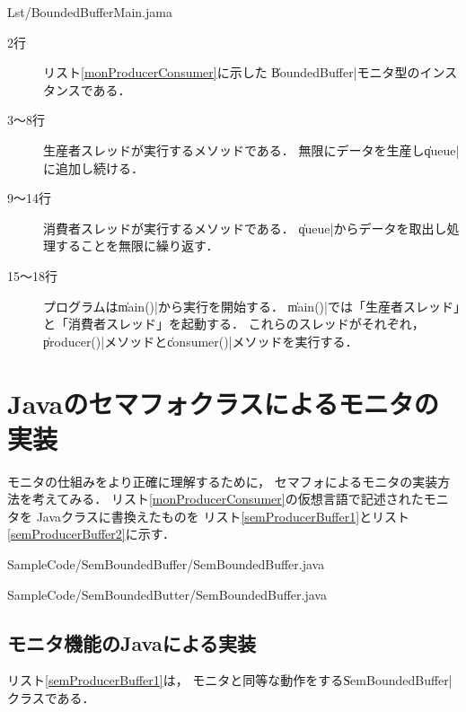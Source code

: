 
                {Lst/BoundedBufferMain.jama}

\begin{description}
\item [2行] 
  リスト\ref{monProducerConsumer}に示した
  \|BoundedBuffer|モニタ型のインスタンスである．
\item [3〜8行]
  生産者スレッドが実行するメソッドである．
  無限にデータを生産し\|queue|に追加し続ける．
\item [9〜14行]
  消費者スレッドが実行するメソッドである．
  \|queue|からデータを取出し処理することを無限に繰り返す．
\item [15〜18行]
  プログラムは\|main()|から実行を開始する．
  \|main()|では「生産者スレッド」と「消費者スレッド」を起動する．
  これらのスレッドがそれぞれ，
  \|producer()|メソッドと\|consumer()|メソッドを実行する．
\end{description}

\section{Javaのセマフォクラスによるモニタの実装}
モニタの仕組みをより正確に理解するために，
セマフォによるモニタの実装方法を考えてみる．
リスト\ref{monProducerConsumer}の仮想言語で記述されたモニタを
Javaクラスに書換えたものを
リスト\ref{semProducerBuffer1}とリスト\ref{semProducerBuffer2}に示す．


                {SampleCode/SemBoundedBuffer/SemBoundedBuffer.java}


                {SampleCode/SemBoundedButter/SemBoundedBuffer.java}

\subsection{モニタ機能のJavaによる実装}
リスト\ref{semProducerBuffer1}は，
モニタと同等な動作をする\|SemBoundedBuffer|クラスである．

